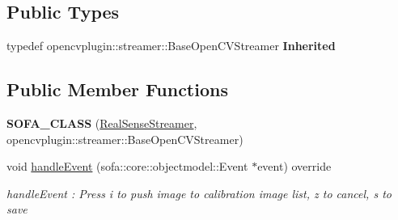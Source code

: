 \subsection*{Public Types}
\begin{DoxyCompactItemize}
\item 
\mbox{\label{classsofa_1_1rgbdtracking_1_1_real_sense_streamer_a5f9ea54db5ca5e9cbbda378e0a93e07b}} 
typedef opencvplugin\+::streamer\+::\+Base\+Open\+C\+V\+Streamer {\bfseries Inherited}
\end{DoxyCompactItemize}
\subsection*{Public Member Functions}
\begin{DoxyCompactItemize}
\item 
\mbox{\label{classsofa_1_1rgbdtracking_1_1_real_sense_streamer_af9aacabd087d62ddcc436b9012d70e49}} 
{\bfseries S\+O\+F\+A\+\_\+\+C\+L\+A\+SS} (\hyperlink{classsofa_1_1rgbdtracking_1_1_real_sense_streamer}{Real\+Sense\+Streamer}, opencvplugin\+::streamer\+::\+Base\+Open\+C\+V\+Streamer)
\item 
void \hyperlink{classsofa_1_1rgbdtracking_1_1_real_sense_streamer_a3881452d7c26ef825640220be00fd034}{handle\+Event} (sofa\+::core\+::objectmodel\+::\+Event $\ast$event) override
\begin{DoxyCompactList}\small\item\em handle\+Event \+: Press i to push image to calibration image list, z to cancel, s to save \end{DoxyCompactList}\end{DoxyCompactItemize}
